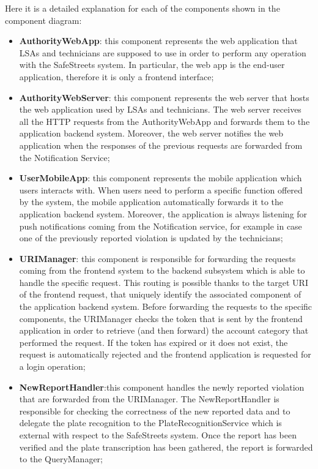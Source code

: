 Here it is a detailed explanation for each of the components shown in the component diagram:
\begin{itemize}%
    \item \textbf{AuthorityWebApp}: this component represents the web application that LSAs and technicians are supposed to use in order to perform any operation with the SafeStreets system. In particular, the web app is the end-user application, therefore it is only a frontend interface;
    \item \textbf{AuthorityWebServer}: this component represents the web server that hosts the web application used by LSAs and technicians. The web server receives all the HTTP requests from the AuthorityWebApp and forwards them to the application backend system. Moreover, the web server notifies the web application when the responses of the previous requests are forwarded from the Notification Service;
    \item \textbf{UserMobileApp}: this component represents the mobile application which users interacts with. When users need to perform a specific function offered by the system, the mobile application automatically forwards it to the application backend system. Moreover, the application is always listening for push notifications coming from the Notification service, for example in case one of the previously reported violation is updated by the technicians;
    \item \textbf{URIManager}: this component is responsible for forwarding the requests coming from the frontend system to the backend subsystem which is able to handle the specific request. This routing is possible thanks to the target URI of the frontend request, that uniquely identify the associated component of the application backend system. Before forwarding the requests to the specific components, the URIManager checks the token that is sent by the frontend application in order to retrieve (and then forward) the account category that performed the request. If the token has expired or it does not exist, the request is automatically rejected and the frontend application is requested for a login operation;
    \item \textbf{NewReportHandler}:this component handles the newly reported violation that are forwarded from the URIManager. The NewReportHandler is responsible for checking the correctness of the new reported data and to delegate the plate recognition to the PlateRecognitionService which is external with respect to the SafeStreets system. Once the report has been verified and the plate transcription has been gathered, the report is forwarded to the QueryManager;

\end{itemize}
